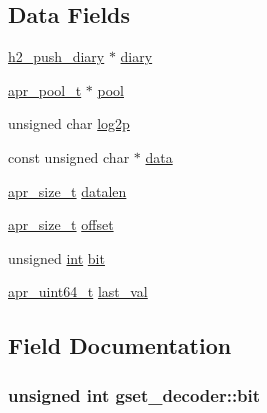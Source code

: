 \subsection*{Data Fields}
\begin{DoxyCompactItemize}
\item 
\hyperlink{structh2__push__diary}{h2\+\_\+push\+\_\+diary} $\ast$ \hyperlink{structgset__decoder_a445958353c94039af63aaaaf3c72ed17}{diary}
\item 
\hyperlink{structapr__pool__t}{apr\+\_\+pool\+\_\+t} $\ast$ \hyperlink{structgset__decoder_a8d62181fe6fe1545ad65a96ee67ea6de}{pool}
\item 
unsigned char \hyperlink{structgset__decoder_a97602621b04e6be2039e906fdda0fa2a}{log2p}
\item 
const unsigned char $\ast$ \hyperlink{structgset__decoder_ae4b82a39719806d09718e3671bf05cc9}{data}
\item 
\hyperlink{group__apr__platform_gaaa72b2253f6f3032cefea5712a27540e}{apr\+\_\+size\+\_\+t} \hyperlink{structgset__decoder_a3994f72f572380e1ff13079324f7bffe}{datalen}
\item 
\hyperlink{group__apr__platform_gaaa72b2253f6f3032cefea5712a27540e}{apr\+\_\+size\+\_\+t} \hyperlink{structgset__decoder_a17fc838fc2564053065fd6f01fa82bcc}{offset}
\item 
unsigned \hyperlink{pcre_8txt_a42dfa4ff673c82d8efe7144098fbc198}{int} \hyperlink{structgset__decoder_ae9cc952b8f4b1ef29d6a927f208dba2e}{bit}
\item 
\hyperlink{group__apr__platform_ga722b277a42230f3fd41cb5be7a76cfb4}{apr\+\_\+uint64\+\_\+t} \hyperlink{structgset__decoder_a872e9cc78692d01a45a2b21a13abe9c1}{last\+\_\+val}
\end{DoxyCompactItemize}


\subsection{Field Documentation}
\subsubsection[{\texorpdfstring{bit}{bit}}]{\setlength{\rightskip}{0pt plus 5cm}unsigned {\bf int} gset\+\_\+decoder\+::bit}\hypertarget{structgset__decoder_ae9cc952b8f4b1ef29d6a927f208dba2e}{}\label{structgset__decoder_ae9cc952b8f4b1ef29d6a927f208dba2e}

